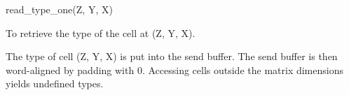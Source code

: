 

\format
read\_type\_one(Z, Y, X)

\purpose

To retrieve the type of the cell at (Z, Y, X).

\description

The type of cell (Z, Y, X) is put into the send buffer.
The send buffer is then word-aligned by padding with 0.
Accessing cells outside the matrix dimensions yields undefined types.
